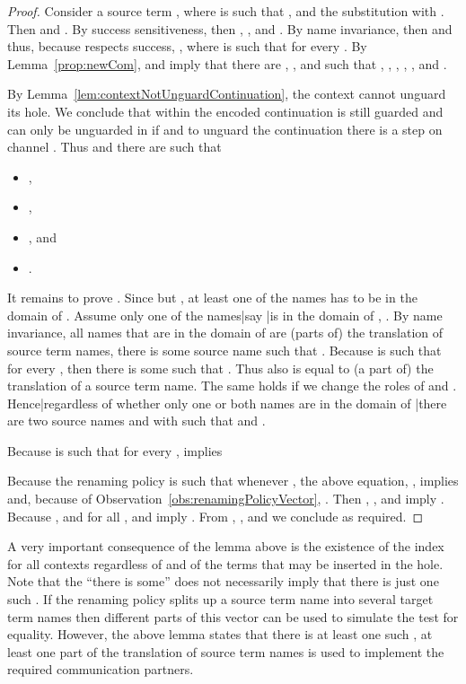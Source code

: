 \documentclass[]{article}
\begin{document}
\begin{proof}
	Consider a source term , where  is such that , and the substitution  with . Then  and . By success sensitiveness, then , \ie , and .
	By name invariance, then  and thus, because  respects success, , where  is such that  for every .
	By Lemma~\ref{prop:newCom},  and  imply that there are , , and  such that , , , , , and .
	
	By Lemma~\ref{lem:contextNotUnguardContinuation}, the context  cannot unguard its hole. We conclude that within  the encoded continuation  is still guarded and can only be unguarded in  if  and to unguard the continuation there is a step on channel .
	Thus  and there are  such that
	\begin{itemize}
		\item ,
		\item ,
		\item , and
		\item .
	\end{itemize}
	
	It remains to prove . Since  but , at least one of the names  has to be in the domain of . Assume only one of the names|say |is in the domain of , \ie . By name invariance, all names that are in the domain of  are (parts of) the translation of source term names, \ie there is some source name  such that .
	Because  is such that  for every , then there is some  such that . Thus also  is equal to (a part of) the translation of a source term name. The same holds if we change the roles of  and .
	Hence|regardless of whether only one or both names are in the domain of |there are two source names  and  with  such that  and .
	
	Because  is such that  for every ,  implies
	\vspace{-1em}
	
	
	\vspace{-1em}
	\noindent
	Because the renaming policy  is such that  whenever , the above equation, \ie , implies  and, because of Observation~\ref{obs:renamingPolicyVector}, .
	Then , , and  imply .
	Because , \ie  and  for all ,  and  imply .
	From , , and  we conclude  as required.
\end{proof}

\noindent
A very important consequence of the lemma above is the existence of the index  for all contexts  regardless of  and of the terms that may be inserted in the hole. Note that the ``there is some'' does not necessarily imply that there is just one such . If the renaming policy splits up a source term name into several target term names then different parts of this vector can be used to simulate the test for equality. However, the above lemma states that there is at least one such , \ie at least one part of the translation of source term names is used to implement the required communication partners.
\end{document}
